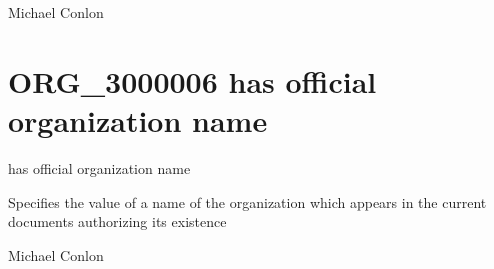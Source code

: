\documentclass[letterpaper,10pt,english]{sphinxmanual}
\begin{document}
\begin{sphinxShadowBox}

\sphinxAtStartPar
Michael Conlon 
\end{sphinxShadowBox}
\begin{quote}

\ignorespaces \end{quote}


\section{ORG\_3000006 \sphinxhyphen{} has official organization name}
\label{\detokenize{doc-ORG_3000006:org-3000006-has-official-organization-name}}\label{\detokenize{doc-ORG_3000006:index-0}}\label{\detokenize{doc-ORG_3000006::doc}}
\begin{sphinxShadowBox}

\sphinxAtStartPar
has official organization name
\end{sphinxShadowBox}

\begin{sphinxShadowBox}

\sphinxAtStartPar
{}
\end{sphinxShadowBox}

\begin{sphinxShadowBox}

\sphinxAtStartPar
Specifies the value of a name of the organization which appears in the current documents authorizing its existence
\end{sphinxShadowBox}

\begin{sphinxShadowBox}

\sphinxAtStartPar
Michael Conlon 
\end{sphinxShadowBox}

\begin{sphinxShadowBox}

\sphinxAtStartPar
{\hyperref[\detokenize{doc-ORG_0000001::doc}]{}}
\end{sphinxShadowBox}
\end{document}
